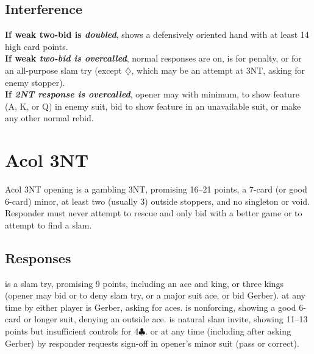 \documentclass[oneside]{memoir}
\def\C{$\clubsuit$}
\def\D{$\diamondsuit$}
\begin{document}
\subsection{Interference}
\textbf{If weak two-bid is \emph{doubled}},  shows a
defensively oriented hand with at least 14 high card points.\\
\textbf{If weak \emph{two-bid is overcalled}}, normal responses are on,
 is for penalty, or 
for an all-purpose slam try (except \D, which may be an attempt at
3NT, asking for enemy stopper).\\
\textbf{If \emph{2NT response is overcalled}},
opener may  with minimum, 
to show feature (A, K, or Q) in enemy suit, bid  to show feature in an unavailable suit, or make any other normal rebid.


\eject

\section{Acol 3NT}
Acol 3NT opening is a gambling 3NT, promising 16--21 points, a 7-card
(or good 6-card) minor, at least two (usually 3) outside stoppers, and
no singleton or void.  Responder must never attempt to rescue and only
bid with a better game or to attempt to find a slam.

\subsection{Responses}
\textbid[lred]{4\C} is a slam try, promising 9 points, including an
ace and king, or three kings (opener may bid  or
 to deny slam try, or  a major suit
ace, or bid \textresp{4\D} Gerber).  \textbid[lpurple]{4\D\ww{a}} at
any time by either player is Gerber, asking for aces.
 is nonforcing, showing a good 6-card or longer
suit, denying an outside ace.   is natural slam
invite, showing 11--13 points but insufficient controls for 4\C.
\textbid[lblue]{5\C} or \textbid[lblue]{6\C} at any time (including
after asking Gerber) by responder requests sign-off in opener's minor
suit (pass or correct).
\end{document}
